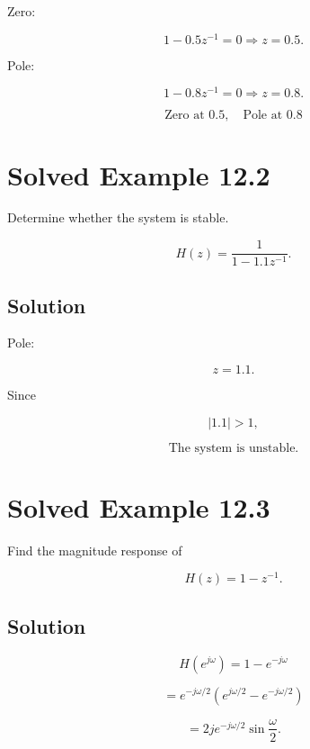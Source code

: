 Zero:

\[
1-0.5z^{-1}=0
\Rightarrow z=0.5.
\]

Pole:

\[
1-0.8z^{-1}=0
\Rightarrow z=0.8.
\]

\[
\boxed{
\text{Zero at }0.5,\quad \text{Pole at }0.8
}
\]


\section{Solved Example 12.2}

Determine whether the system is stable.

\[
H(z)=
\frac{1}{1-1.1z^{-1}}.
\]


\subsection{Solution}

Pole:

\[
z=1.1.
\]

Since

\[
|1.1|>1,
\]

\[
\boxed{
\text{The system is unstable.}
}
\]


\section{Solved Example 12.3}

Find the magnitude response of

\[
H(z)=1-z^{-1}.
\]


\subsection{Solution}

\[
H(e^{j\omega})=1-e^{-j\omega}
\]

\[
=
e^{-j\omega/2}
\left(
e^{j\omega/2}-e^{-j\omega/2}
\right)
\]

\[
=
2je^{-j\omega/2}\sin\frac{\omega}{2}.
\]

